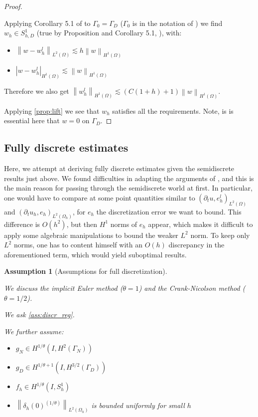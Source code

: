 \documentclass[english,a4paper,10pt,oneside]{scrbook}	%
\theoremstyle{break}
\newtheorem{ass}[equation]{Assumption}
\newenvironment{mproof}[1][\proofname]{%
  \begin{proof}[#1]$ $\par\nobreak\ignorespaces
}{%
  \end{proof}
}
\renewcommand*{\proofname}{Proof}
\theoremstyle{remark}
\newcommand{\norm}[1]{\left\lVert#1\right\rVert}
\begin{document}
\begin{mproof}
Applying Corollary 5.1 of \cite{bernardi} to $\Gamma_0=\Gamma_D$ ($\Gamma_0$ is in the notation of \cite{bernardi}) we find $w_h \in S^{1}_{h,D}$ (true by Proposition and Corollary 5.1, \cite{bernardi}), with:

\begin{itemize}
	\item $\norm{w-w_h^l}_{L^2(\Omega)}\lesssim h \norm{w}_{H^1(\Omega)}$
	\item $|w-w_h^l|_{H^1(\Omega)}\lesssim \norm{w}_{H^1(\Omega)}$
\end{itemize}

Therefore we also get $\norm{w_h^l}_{H^1(\Omega)} \lesssim(C(1+h)+1)\norm{w}_{H^1(\Omega)}$.

Applying \cref{prop:lift} we see that $w_h$ satisfies all the requirements. Note, is is essential here that $w=0$ on $\Gamma_D$.


\end{mproof}

\subsection{Fully discrete estimates}

Here, we attempt at deriving fully discrete estimates given the semidiscrete results just above. We found difficulties in adapting the arguments of \cite{thomee}, and this is the main reason for passing through the semidiscrete world at first. In particular, one would have to compare at some point quantities similar to $(\partial_t u, e_h^l)_{L^2(\Omega)}$ and $(\partial_t u_h, e_h)_{L^2(\Omega_h)}$, for $e_h$ the discretization error we want to bound. This difference is $O(h^2)$, but then $H^1$ norms of $e_h$ appear, which makes it difficult to apply some algebraic manipulations to bound the weaker $L^2$ norm. To keep only $L^2$ norms, one has to content himself with an $O(h)$ discrepancy in the aforementioned term, which would yield suboptimal results.

\begin{ass}[Assumptions for full discretization]
\label{ass:full_discr_smoothness}
\textcolor{white}{ }

We discuss the implicit Euler method ($\theta=1$) and the Crank-Nicolson method ($\theta=1/2$).

We ask \cref{ass:discr_reg}.

We further assume:

\begin{itemize}
	\item $g_N \in H^{1/\theta}(I, H^2(\Gamma_N))$
	\item $g_D \in H^{1/\theta+1}(I, H^{3/2}(\Gamma_D))$
	\item $f_h\in H^{1/\theta}(I, S^1_{h})$
	\item $\norm{\delta_{h}(0)^{(1/\theta)}}_{L^2(\Omega_h)}$ is bounded uniformly for small $h$
\end{itemize}

\end{ass}
\end{document}
